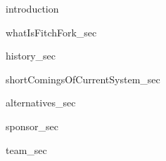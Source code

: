 {introduction}

{whatIsFitchFork_sec}

{history_sec}

{shortComingsOfCurrentSystem_sec}

{alternatives_sec}

{sponsor_sec}

{team_sec}